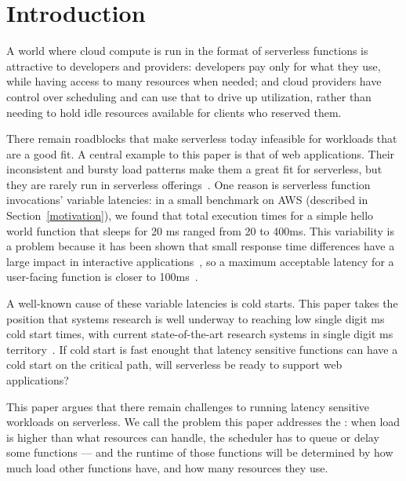 \section{Introduction}

A world where cloud compute is run in the format of serverless functions is
attractive to developers and providers: developers pay only for what they use,
while having access to many resources when needed; and cloud providers have
control over scheduling and can use that to drive up utilization, rather than
needing to hold idle resources available for clients who reserved them.


There remain roadblocks that make serverless today infeasible for workloads that
are a good fit. A central example to this paper is that of web applications.
Their inconsistent and bursty load patterns make them a great fit for
serverless, but they are rarely run in serverless
offerings~\cite{reddit-serverless1, reddit-serverless2, not-lambda-blog}. One
reason is serverless function invocations' variable latencies: in a small
benchmark on AWS (described in Section~\ref{motivation}), we found that total
execution times for a simple hello world function that sleeps for 20 ms ranged
from 20 to 400ms. This variability is a problem because it has been shown that
small response time differences have a large impact in interactive
applications~\cite{amz-page-load,google-page-load}, so a maximum acceptable
latency for a user-facing function is closer to 100ms~\cite{page-load-time}.


A well-known cause of these variable latencies is cold starts. This paper takes
the position that systems research is well underway to reaching low single digit
ms cold start times, with current state-of-the-art research systems in single
digit ms territory~\cite{sigmaos,mitosis}. If cold start is fast enought that
latency sensitive functions can have a cold start on the critical path, will
serverless be ready to support web applications?

This paper argues that there remain challenges to running latency sensitive
workloads on serverless. We call the problem this paper addresses the
\emph{\problem{}}: when load is higher than what resources can handle, the
scheduler has to queue or delay some functions --- and the runtime of those
functions will be determined by how much load other functions have, and how many
resources they use.


